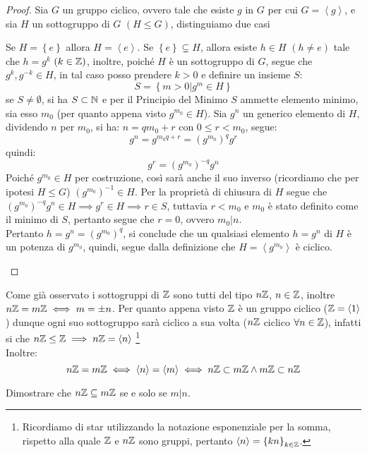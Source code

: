 \documentclass[11pt]{scrartcl}
\begin{document}
\begin{proof}
Sia $G$ un gruppo ciclico, ovvero tale che esiste $g$ in $G$ per cui $G=\left<g\right>$, e sia $H$ un sottogruppo di $G$ $(H \leqslant G)$, distinguiamo due casi
\begin{itemize}
	\ii Se $H=\left\{e\right\}$ allora $H=\left<e\right>$.
	\ii Se $\left\{e\right\} \subsetneq H$, allora esiste $h \in H$ $(h \neq e)$ tale che $h=g^k$ $(k \in \mathbb Z)$, inoltre, poiché $H$ è un sottogruppo di $G$, segue che $g^k,g^{-k}\in H$, in tal caso posso prendere $k>0$ e definire un insieme $S$:
	\[ S
	=
	\left\{m>0 | g^m \in H\right\}
	\]
	se $S \ne \emptyset$, si ha $S \subset \mathbb N$ e per il Principio del Minimo $S$ ammette elemento minimo, sia esso $m_0$ (per quanto appena visto $g^{m_0} \in H$). Sia $g^n $ un generico elemento di $H$, dividendo $n$ per $m_0$, si ha: $n=qm_0+r$ con $0 \leq r < m_0$, segue:
		\[ g^n=g^{m_0q+r}=(g^{m_0})^qg^r
		\]
		quindi:
		\[ g^r=(g^{m_0})^{-q}g^n
		\]
Poiché $g^{m_0} \in H$ per costruzione, così sarà anche il suo inverso (ricordiamo che per ipotesi $H\leqslant G$) $(g^{m_0})^{-1} \in H$. Per la proprietà di chiusura di $H$ segue che $(g^{m_0})^{-q}g^n \in H \implies g^r \in H \implies r \in S$, tuttavia $r<m_0$ e $m_0$ è stato definito come il minimo di $S$, pertanto segue che $r=0$, ovvero $m_0 | n$. \\
Pertanto $h=g^n=(g^{m_0})^q$, si conclude che un qualsiasi elemento $h=g^n$ di $H$ è un potenza di $g^{m_0}$, quindi, segue dalla definizione che $H  = \left<g^{m_0}\right>$ è ciclico.
\end{itemize}
\end{proof}

\begin{remark}
[Sottogruppi Di $\ZZ$]
Come già osservato i sottogruppi di $\ZZ$ sono tutti del tipo $n\mathbb Z$, $n \in \mathbb Z$, inoltre $n\mathbb Z=m\mathbb Z \iff m = \pm n$. Per quanto appena visto $\ZZ$ è un gruppo ciclico ($\mathbb Z=\left<1\right>$) dunque
 ogni suo sottogruppo sarà ciclico a sua volta ($n\mathbb Z$ ciclico $\forall n \in \mathbb Z$), infatti si che $n\mathbb Z \leq \mathbb Z \implies n\mathbb Z = \left<n\right>$
\footnote{Ricordiamo di star utilizzando la notazione esponenziale per la somma, rispetto alla quale $\ZZ$ e $n\mathbb Z$ sono gruppi, pertanto $\left<n\right>=\left\{ kn \right\}_{k \in \mathbb Z}$.} \\
Inoltre:
	\[ n\mathbb Z
	=
	m\mathbb Z
	\iff
	\left<n\right>
	=
	\left<m\right>
	\iff
	n\mathbb Z \subset m\mathbb Z
	\wedge
	m\mathbb Z \subset n\mathbb Z
	\]
\end{remark}

\begin{exercise}
\label{g:ex135}
Dimostrare che $n\mathbb Z \subseteq m\mathbb Z$ se e solo se $m|n$.
\end{exercise}
\end{document}

